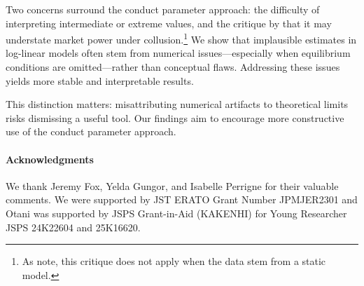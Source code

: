 \documentclass[11pt, a4paper]{article}
\theoremstyle{remark}
\begin{document}

Two concerns surround the conduct parameter approach: the difficulty of interpreting intermediate or extreme values, and the critique by \citet{corts1999conduct} that it may understate market power under collusion.\footnote{As \citet{magnolfi2022comparison} note, this critique does not apply when the data stem from a static model.}
We show that implausible estimates in log-linear models often stem from numerical issues—especially when equilibrium conditions are omitted—rather than conceptual flaws. 
Addressing these issues yields more stable and interpretable results.

This distinction matters: misattributing numerical artifacts to theoretical limits risks dismissing a useful tool. Our findings aim to encourage more constructive use of the conduct parameter approach.



\paragraph{Acknowledgments}
We thank Jeremy Fox, Yelda Gungor, and Isabelle Perrigne for their valuable comments. 
We were supported by JST ERATO Grant Number JPMJER2301 and Otani was supported by JSPS Grant-in-Aid (KAKENHI) for Young Researcher JSPS 24K22604 and 25K16620.
\end{document}
